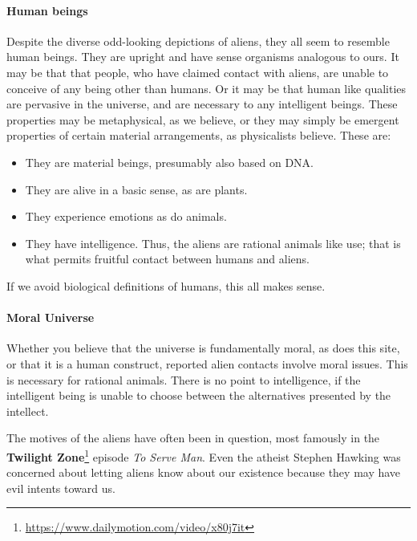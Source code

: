 \paragraph{Human beings}


Despite the diverse odd-looking depictions of aliens, they all seem to resemble human beings. They are upright and have sense organisms analogous to ours. It may be that that people, who have claimed contact with aliens, are unable to conceive of any being other than humans. Or it may be that human like qualities are pervasive in the universe, and are necessary to any intelligent beings. These properties may be metaphysical, as we believe, or they may simply be emergent properties of certain material arrangements, as physicalists believe. These are:

\begin{itemize}


\item They are material beings, presumably also based on DNA.

\item They are alive in a basic sense, as are plants.

\item They experience emotions as do animals.

\item They have intelligence. Thus, the aliens are rational animals like use; that is what permits fruitful contact between humans and aliens.
\end{itemize}


If we avoid biological definitions of humans, this all makes sense.

\paragraph{Moral Universe}


Whether you believe that the universe is fundamentally moral, as does this site, or that it is a human construct, reported alien contacts involve moral issues. This is necessary for rational animals. There is no point to intelligence, if the intelligent being is unable to choose between the alternatives presented by the intellect.

The motives of the aliens have often been in question, most famously in the \textbf{Twilight Zone}\footnote{\url{https://www.dailymotion.com/video/x80j7it}} episode \emph{To Serve Man}. Even the atheist Stephen Hawking was concerned about letting aliens know about our existence because they may have evil intents toward us.

